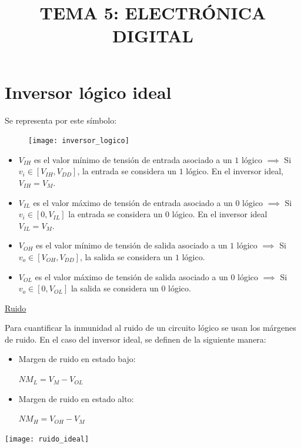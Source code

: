 \documentclass[10pt,a4paper]{article}
\begin{document}
	\title{TEMA 5: ELECTRÓNICA DIGITAL}
	\date{}
	\author{}
	\maketitle
	
	\section{Inversor lógico ideal}
	
	Se representa por este símbolo: 
	
	\begin{figure}[h]
		\texttt{[image: inversor\_logico]}
		\centering
	\end{figure}

	
	\begin{itemize}
		\item $V_{IH}$ es el valor mínimo de tensión de entrada asociado a un $1$ lógico $\implies$ Si $v_i \in [V_{IH}, V_{DD}]$, la entrada se considera un $1$ lógico. En el inversor ideal, $V_{IH} = V_M$.
		\item $V_{IL}$ es el valor máximo de tensión de entrada asociado a un $0$ lógico $\implies$ Si $v_i \in [0, V_{IL}]$ la entrada se considera un $0$ lógico. En el inversor ideal $V_{IL} = V_M$.
		\item $V_{OH}$ es el valor mínimo de tensión de salida asociado a un $1$ lógico $\implies$ Si $v_o \in [V_{OH}, V_{DD}]$, la salida se considera un $1$ lógico.
		\item $V_{OL}$ es el valor máximo de tensión de salida asociado a un $0$ lógico $\implies$ Si $v_o \in [0, V_{OL}]$ la salida se considera un $0$ lógico.
	\end{itemize}
	
	\underline{{\large Ruido}}
	\newline

	Para cuantificar la inmunidad al ruido de un circuito lógico se usan los márgenes de ruido. En el caso del inversor ideal, se definen de la siguiente manera: \newline
	
	\begin{minipage}[t]{.45\textwidth}
		\begin{center}
			\begin{itemize}
				\item Margen de ruido en estado bajo: \begin{center}
					$\boxed{NM_L = V_M - V_{OL}}$
				\end{center}
				\item Margen de ruido en estado alto: \begin{center}
					$\boxed{NM_H = V_{OH} - V_M}$
				\end{center}
			\end{itemize}
		\end{center}
	\end{minipage}%
	\begin{minipage}[t]{.45\textwidth}
		\raggedleft
		\begin{center}
			\texttt{[image: ruido\_ideal]}
		\end{center}
		
	\end{minipage}
\end{document}
